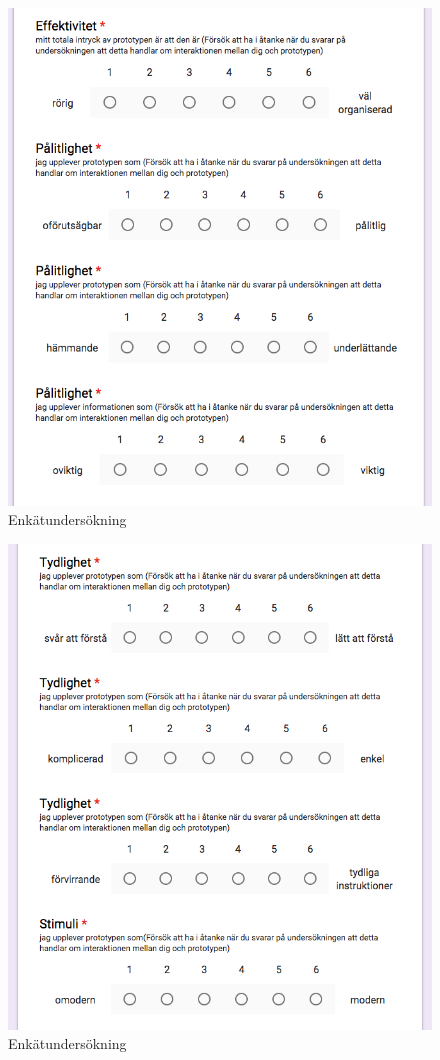  \begin{figure} [H]
   \centering
   \includegraphics[scale=0.75]{form3.png}
  \captionsetup{justification=centering,margin=2cm}
  \caption{Enkätundersökning}
 \end{figure} 
 
  \begin{figure} [H]
   \centering
   \includegraphics[scale=0.75]{form4.png}
  \captionsetup{justification=centering,margin=2cm}
  \caption{Enkätundersökning}
 \end{figure} 
 
